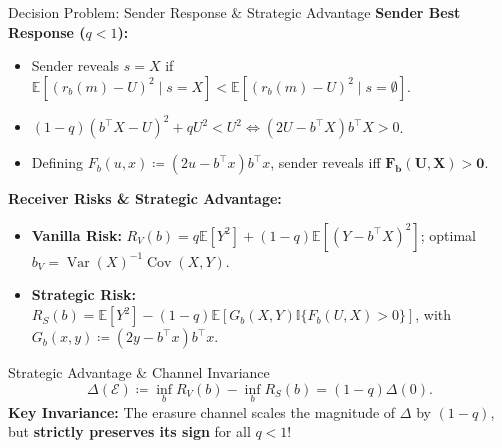 \documentclass[aspectratio=169, 11pt, t, xcolor=table]{beamer}
\newcommand{\E}{\mathbb{E}}
\newcommand{\I}[1]{\mathbb{I}\{#1\}}
\newcommand{\env}{\mathcal{E}}
\begin{document}
\begin{frame}{Decision Problem: Sender Response \& Strategic Advantage}
\small
\textbf{Sender Best Response ($q < 1$):}
\begin{itemize}\itemsep=0.5pt
  \footnotesize
  \item Sender reveals $s = X$ if $\E[(r_b(m) - U)^2 \mid s = X] < \E[(r_b(m) - U)^2 \mid s = \emptyset]$.
  \item $(1-q)(b^\top X - U)^2 + q U^2 < U^2 \iff (2U - b^\top X) b^\top X > 0$.
  \item Defining $F_b(u, x) \coloneqq (2u - b^\top x) b^\top x$, sender reveals iff $\mathbf{F_b(U, X) > 0}$.
\end{itemize}

\vspace{0.1em}
\textbf{Receiver Risks \& Strategic Advantage:}
\begin{itemize}\itemsep=0.5pt
  \footnotesize
  \item \textbf{Vanilla Risk:} $R_V(b) = q\E[Y^2] + (1-q)\E[(Y - b^\top X)^2]$; optimal $b_V = \operatorname{Var}(X)^{-1} \operatorname{Cov}(X,Y)$.
  \item \textbf{Strategic Risk:} $R_S(b) = \E[Y^2] - (1-q)\E[G_b(X,Y) \I{F_b(U,X) > 0}]$, with $G_b(x, y) \coloneqq (2y - b^\top x) b^\top x$.
\end{itemize}

\vspace{0.1em}
\begin{block}{Strategic Advantage \& Channel Invariance}
\footnotesize
\[
  \Delta(\env) \coloneqq \inf_b R_V(b) - \inf_b R_S(b) = (1-q) \Delta(0).
\]
\textbf{Key Invariance:} The erasure channel scales the magnitude of $\Delta$ by $(1-q)$, but \textbf{strictly preserves its sign} for all $q < 1$!
\end{block}
\end{frame}
\end{document}
